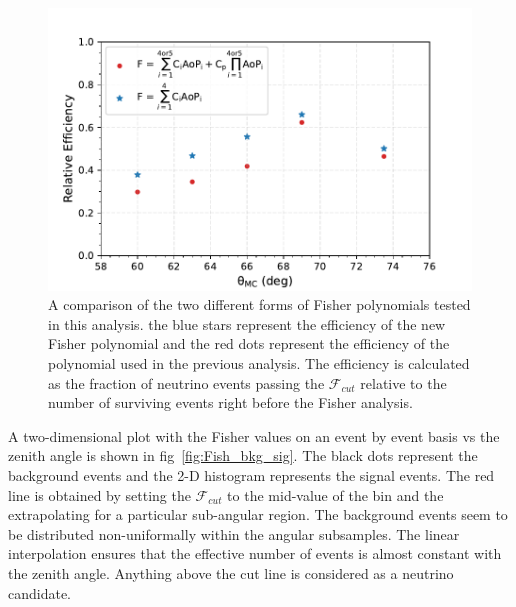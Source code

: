 \begin{figure}[h!]
  \centering
  \includegraphics[width=\textwidth]{thesis_figures/Nu_analysis/Nu_eff/Fisher_efficencies_theta_F_wnt_redcut.pdf}
  \caption{A comparison of the two different forms of Fisher polynomials tested in this analysis. the blue stars represent the efficiency of the new Fisher polynomial and the red dots represent the efficiency of the polynomial used in the previous analysis. The efficiency is calculated as the fraction of neutrino events passing the $\mathcal{F}_{cut}$ relative to the number of surviving events right before the Fisher analysis.}
  \label{fig:Fishpol_v_theta}
\end{figure}

A two-dimensional plot with the Fisher values on an event by event basis vs the zenith angle is shown in fig~\ref{fig:Fish_bkg_sig}. The black dots represent the background events and the 2-D histogram represents the signal events. The red line is obtained by setting the $\mathcal{F}_{cut}$ to the mid-value of the bin and the extrapolating for a particular sub-angular region. The background events seem to be distributed non-uniformally within the angular subsamples. The linear interpolation ensures that the effective number of events is almost constant with the zenith angle. Anything above the cut line is considered as a neutrino candidate. 


